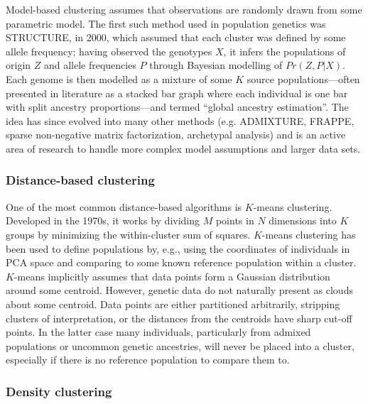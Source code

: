 Model-based clustering assumes that observations are randomly drawn from some parametric model. The first such method used in population genetics was STRUCTURE, in 2000, which assumed that each cluster was defined by some allele frequency; having observed the genotypes $X$, it infers the populations of origin $Z$ and allele frequencies $P$ through Bayesian modelling of $Pr(Z, P|X)$\citep{pritchard_inference_2000}. Each genome is then modelled as a mixture of some $K$ source populations---often presented in literature as a stacked bar graph where each individual is one bar with split ancestry proportions---and termed ``global ancestry estimation''\citep{alexander_fast_2009}. The idea has since evolved into many other methods (e.g. ADMIXTURE\citep{alexander_fast_2009}, FRAPPE\citep{tang_estimation_2005}, sparse non-negative matrix factorization\citep{frichot_fast_2014}, archetypal analysis\citep{gimbernat-mayol_archetypal_2022}) and is an active area of research to handle more complex model assumptions and larger data sets.

\subsubsection{Distance-based clustering}

One of the most common distance-based algorithms is $K$-means clustering. Developed in the 1970s, it works by dividing $M$ points in $N$ dimensions into $K$ groups by minimizing the within-cluster sum of squares\citep{hartigan_algorithm_1979}. $K$-means clustering has been used to define populations by, e.g., using the coordinates of individuals in PCA space and comparing to some known reference population within a cluster. $K$-means implicitly assumes that data points form a Gaussian distribution around some centroid\citep{mcinnes_accelerated_2017}. However, genetic data do not naturally present as clouds about some centroid. Data points are either partitioned arbitrarily, stripping clusters of interpretation, or the distances from the centroids have sharp cut-off points. In the latter case many individuals, particularly from admixed populations or uncommon genetic ancestries, will never be placed into a cluster, especially if there is no reference population to compare them to\citep{ding_polygenic_2023}.

\subsubsection{Density clustering}

